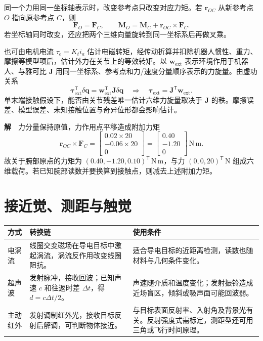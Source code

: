 同一个力用同一坐标轴表示时，改变参考点只改变对应力矩。若 $\boldsymbol r_{OC}$ 从新参考点 $O$ 指向原参考点 $C$，则
\[
\boldsymbol F_O=\boldsymbol F_C,\qquad
\boldsymbol M_O=\boldsymbol M_C+\boldsymbol r_{OC}\times\boldsymbol F_C .
\]
若坐标轴同时改变，还应把两个三维向量旋转到同一坐标系后再做叉乘。

也可由电机电流 $\tau_e=K_t i_a$ 估计电磁转矩，经传动折算并扣除机器人惯性、重力、摩擦等模型项后，估计外力在关节上的等效转矩。以 $\boldsymbol w_{\mathrm{ext}}$ 表示环境作用于机器人、与雅可比 $\mathbf J$ 用同一坐标系、参考点和力/速度分量顺序表示的力旋量。由虚功关系
\[
\boldsymbol\tau_{\mathrm{ext}}^{\mathsf T}\delta\boldsymbol q
=\boldsymbol w_{\mathrm{ext}}^{\mathsf T}\mathbf J\delta\boldsymbol q
\quad\Longrightarrow\quad
\boldsymbol\tau_{\mathrm{ext}}=\mathbf J^{\mathsf T}\boldsymbol w_{\mathrm{ext}} .
\]
单末端接触假设下，能否由关节残差唯一估计六维力旋量取决于 $\mathbf J$ 的秩。摩擦误差、模型误差、未知接触位置与奇异位形都会影响估计。


\textbf{解}　力分量保持原值，力作用点平移造成附加力矩
\[
\boldsymbol r_{OC}\times\boldsymbol F_C
=\begin{bmatrix}0.02\times20\\-0.06\times20\\0\end{bmatrix}
=\begin{bmatrix}0.40\\-1.20\\0\end{bmatrix}\,\mathrm{N\,m}.
\]
故关于腕部原点的力矩为 $(0.40,-1.20,0.10)^{\mathsf T}\,\mathrm{N\,m}$，与力 $(0,0,20)^{\mathsf T}\,\mathrm N$ 组成六维载荷。若已知腕部读数并要换算到接触点，则减去上述附加力矩。

\FloatBarrier
\section{接近觉、测距与触觉}

\begin{table}[htbp]
\centering\small
\begin{tabularx}{\linewidth}{@{}p{2.2cm} X X@{}}
\toprule
方式 & 转换链 & 使用条件 \\
\midrule
电涡流 & 线圈交变磁场在导电目标中激起涡流，涡流反作用改变线圈阻抗。 & 适合导电目标的近距离检测，读数也随材料与几何条件变化。 \\
超声波 & 发射脉冲，接收回波；已知声速 $c$ 和往返时差 $\Delta t$，得 $d=c\Delta t/2$。 & 声速随介质和温度变化；发射振铃造成近场盲区，倾斜或吸声面可能回波弱。 \\
主动红外 & 发射调制红外光，接收目标反射后解调，可判断物体接近。 & 与目标表面反射率、入射角及背景光有关。反射强度式需标定，测距型还可用三角或飞行时间原理。 \\
\bottomrule
\end{tabularx}
\end{table}

